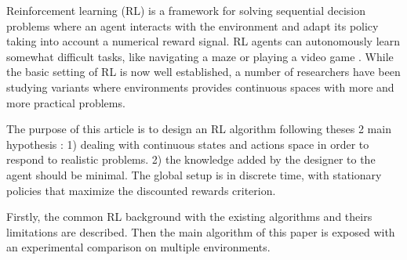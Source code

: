 Reinforcement learning (RL) \cite{Sutton1998} is a framework for solving sequential decision
problems where an agent interacts with the environment and adapt its policy
taking into account a numerical reward signal. RL agents can autonomously
learn somewhat difficult tasks, like navigating a maze or playing a video game \cite{Tesauro1994}.
While the basic setting of RL is now well established, a number of researchers have been
studying variants where environments provides continuous spaces with more and more practical problems.

The purpose of this article is to design an RL algorithm following theses 2 main hypothesis :
1) dealing with continuous states and actions space in order to respond to realistic problems.
2) the knowledge added by the designer to the agent should be minimal.
The global setup is in discrete time, with stationary policies that maximize the
discounted rewards criterion.



Firstly, the common RL background with the existing algorithms and theirs limitations are described.
Then the main algorithm of this paper is exposed with an experimental comparison on multiple environments.
